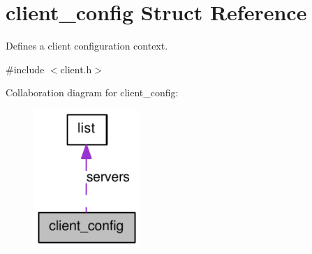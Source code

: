\hypertarget{structclient__config}{
\section{client\_\-config Struct Reference}
\label{structclient__config}
}


Defines a client configuration context.  




{\ttfamily \#include $<$client.h$>$}



Collaboration diagram for client\_\-config:\nopagebreak
\begin{figure}[H]
\begin{center}
\leavevmode
\includegraphics[width=114pt]{structclient__config__coll__graph}
\end{center}
\end{figure}
